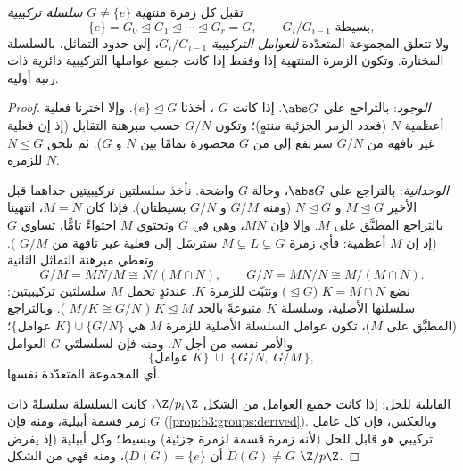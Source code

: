 \begin{theorem}\label{thm:b3:groups:jordanholder}
تقبل كل زمرة منتهية $G \neq \{e\}$ \emph{سلسلة
تركيبية}
\[
\{e\} = G_0 \trianglelefteq G_1 \trianglelefteq \cdots
\trianglelefteq G_r = G,
\qquad G_{i}/G_{i-1} \text{ بسيطة},
\]
ولا تتعلق المجموعة المتعدّدة \emph{للعوامل التركيبية}
$G_i/G_{i-1}$، إلى حدود التماثل، بالسلسلة المختارة. وتكون الزمرة
المنتهية  إذا وفقط إذا كانت جميع عواملها التركيبية
دائرية ذات رتبة أولية.
\end{theorem}

\begin{proof}
\emph{الوجود}: بالتراجع على $\abs G$. إذا كانت $G$ ، أخذنا
$\{e\} \trianglelefteq G$. وإلا اخترنا  فعلية أعظمية $N$ (فعدد
الزمر الجزئية منتهٍ)؛ وتكون $G/N$  حسب مبرهنة التقابل (إذ
إن  فعلية غير تافهة من $G/N$ سترتفع إلى  من $G$ محصورة تمامًا بين $N$ و $G$). ثم نلحق
$N \trianglelefteq G$  للزمرة $N$.

\emph{الوحدانية}: بالتراجع على $\abs G$، وحالة $G$ 
واضحة. نأخذ سلسلتين تركيبيتين حداهما قبل الأخير $M \trianglelefteq G$ و
$N \trianglelefteq G$ (ومنه $G/M$ و $G/N$ بسيطتان). فإذا كان $M = N$، انتهينا
بالتراجع المطبَّق على $M$. وإلا فإن $MN$، وهي  في $G$
وتحتوي $M$ احتواءً تامًّا، تساوي $G$ (إذ إن $M$  أعظمية:
فأي زمرة  $M \subsetneq L
\subsetneq G$ سترسَل إلى  فعلية غير
تافهة من $G/M$ ). وتعطي مبرهنة التماثل الثانية
\[
G/M = MN/M \cong N/(M \cap N),
\qquad
G/N = MN/N \cong M/(M \cap N).
\]
نضع $K = M \cap N$ ($\trianglelefteq G$) ونثبّت  للزمرة $K$. عندئذٍ
تحمل $M$ سلسلتين تركيبيتين: سلسلتها الأصلية، وسلسلة $K$ متبوعةً
بالحد $K \trianglelefteq
M$ ( $M/K \cong G/N$ ). وبالتراجع
(المطبَّق على $M$)، تكون عوامل السلسلة الأصلية للزمرة $M$ هي
$\{\text{عوامل } K\} \cup \{G/N\}$؛ والأمر نفسه من أجل $N$. ومنه فإن لسلسلتَي $G$ العوامل
\[
\{\text{عوامل } K\} \;\cup\; \{\,G/N,\; G/M\,\},
\]
أي المجموعة المتعدّدة نفسها.

القابلية للحل: إذا كانت جميع العوامل من الشكل $\Z/p_i\Z$، كانت
السلسلة سلسلةً ذات زمر قسمة أبيلية، ومنه فإن $G$ 
(\cref{prop:b3:groups:derived}). وبالعكس، فإن كل عامل تركيبي  هو
قابل للحل (لأنه زمرة قسمة لزمرة جزئية) وبسيط؛ وكل 
 أبيلية (إذ يفرض $D(G) \ne G$ أن $D(G) = \{e\}$)، ومنه
فهي من الشكل $\Z/p\Z$.
\end{proof}

